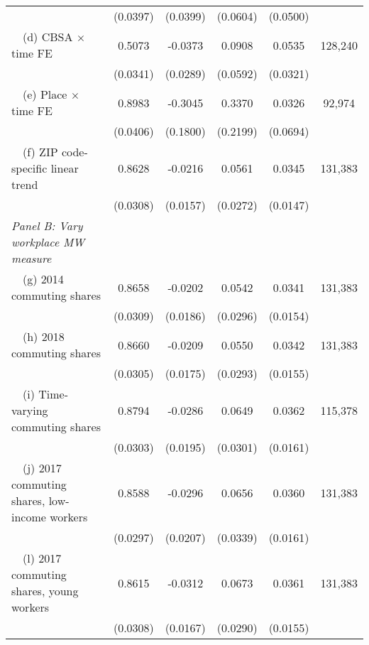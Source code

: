 \begin{landscape}
\begin{table}[ht!]
\begin{tabular}{@{}lccccc@{}}
                                                             & (0.0397) & (0.0399) & (0.0604) & (0.0500) &      \\
        $\quad$(d) CBSA $\times$ time FE                     &  0.5073  &  -0.0373  &  0.0908  &  0.0535  & 128,240 \\
                                                             & (0.0341) & (0.0289) & (0.0592) & (0.0321) &      \\
        $\quad$(e) Place $\times$ time FE                    &  0.8983  &  -0.3045  &  0.3370  &  0.0326  & 92,974 \\
                                                             & (0.0406) & (0.1800) & (0.2199) & (0.0694) &      \\
        $\quad$(f) ZIP code-specific linear trend            &  0.8628  &  -0.0216  &  0.0561  &  0.0345  & 131,383 \\
                                                             & (0.0308) & (0.0157) & (0.0272) & (0.0147) &      \\
        \textit{Panel B: Vary workplace MW measure}          &       &       &       &       &      \\
        $\quad$(g) 2014 commuting shares                     &  0.8658  &  -0.0202  &  0.0542  &  0.0341  & 131,383 \\
                                                             & (0.0309) & (0.0186) & (0.0296) & (0.0154) &      \\
        $\quad$(h) 2018 commuting shares                     &  0.8660  &  -0.0209  &  0.0550  &  0.0342  & 131,383 \\
                                                             & (0.0305) & (0.0175) & (0.0293) & (0.0155) &      \\
        $\quad$(i) Time-varying commuting shares             &  0.8794  &  -0.0286  &  0.0649  &  0.0362  & 115,378 \\
                                                             & (0.0303) & (0.0195) & (0.0301) & (0.0161) &      \\
        $\quad$(j) 2017 commuting shares, low-income workers &  0.8588  &  -0.0296  &  0.0656  &  0.0360  & 131,383 \\
                                                             & (0.0297) & (0.0207) & (0.0339) & (0.0161) &      \\
        $\quad$(l) 2017 commuting shares, young workers      &  0.8615  &  -0.0312  &  0.0673  &  0.0361  & 131,383 \\
                                                             & (0.0308) & (0.0167) & (0.0290) & (0.0155) &      \\ \bottomrule
    \end{tabular}


\end{table}
\end{landscape}
